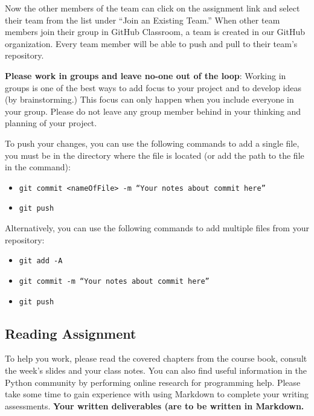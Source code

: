 Now the other members of the team can click on the assignment link and select their team from the list under ``Join an Existing Team.'' When other team members join their group in GitHub Classroom, a team is created in our GitHub organization. Every team member will be able to push and pull to their team’s repository. 

\textbf{Please work in groups and leave no-one out of the loop}: Working in groups is one of the best ways to add focus to your project and to develop ideas (by brainstorming.) This focus can only happen when you include everyone in your group. Please do not leave any group member behind in your thinking and planning of your project.



To push your changes, you can use the following commands to add a single file, you must be in the directory where the file is located (or add the path to the file in the command):
	\begin{itemize}
		\item {\tt git commit <nameOfFile> -m ``Your notes about commit here''}
		\item {\tt git push}
	\end{itemize}
	Alternatively, you can use the following commands to add multiple files from your repository:
		\begin{itemize}
		\item {\tt git add -A}
		\item {\tt git commit -m ``Your notes about commit here''}
		\item {\tt git push}
	\end{itemize}

\vspace*{-.1in}
\subsection*{Reading Assignment}
\vspace*{-.1in}
To help you work, please read the covered chapters from the course book, consult the week's slides and your class notes. You can also find useful information in the Python community by performing online research for programming help. Please take some time to gain experience with using Markdown to complete your writing assessments. \textbf{Your written deliverables (are to be written in Markdown.} 

